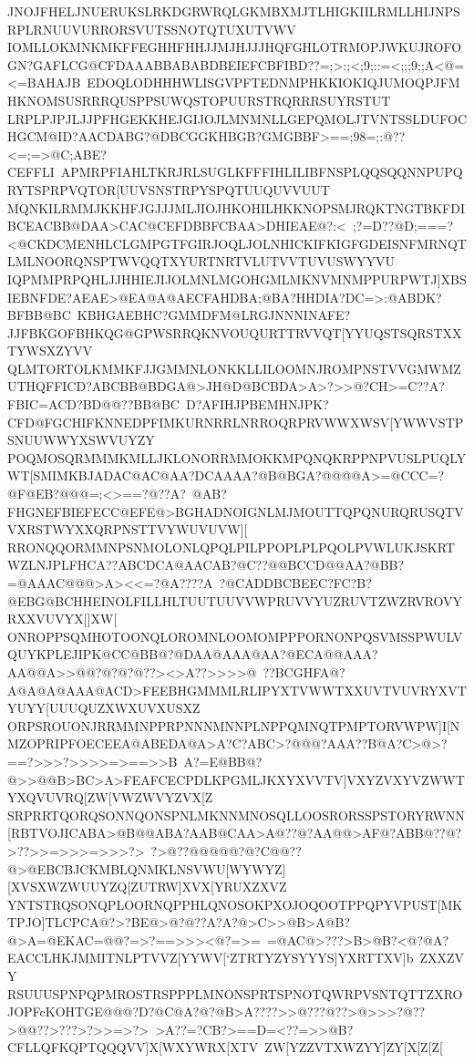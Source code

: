 {{{ JNOJFHELJNUERUKSLRKDGRWRQLGKMBXMJTLHIGKIILRMLLHIJNPSRPLRNUUVURRORSVUTSSNOTQTUXUTVWV}
 \hbox{IOMLLOKMNKMKFFEGHHFHHJJMJHJJJHQFGHLOTRMOPJWKUJROFOGN?GAFLCG@CFDAAABBABABDBEIEFCBFIBD??=;>:;<;9;::=<;;;9;;A<@=<=BAHAJB%
 EDOQLODHHHWLISGVPFTEDNMPHKKIOKIQJUMOQPJFMHKNOMSUSRRRQUSPPSUWQSTOPUURSTRQRRRSUYRSTUT}
 \hbox{LRPLPJPJLJJPFHGEKKHEJGIJOJLMNMNLLGEPQMOLJTVNTSSLDUFOCHGCM@ID?AACDABG?@DBCGGKHBGB?GMGBBF>==;98=;:@??<=;=>@C;ABE?CEFFLI%
 APMRPFIAHLTKRJRLSUGLKFFFIHLILIBFNSPLQQSQQNNPUPQRYTSPRPVQTOR[UUVSNSTRPYSPQTUUQUVVUUT}
 \hbox{MQNKILRMMJKKHFJGJJJMLJIOJHKOHILHKKNOPSMJRQKTNGTBKFDIBCEACBB@DAA>CAC@CEFDBBFCBAA>DHIEAE@?:<%
 ;?=D??@D;===?<@CKDCMENHLCLGMPGTFGIRJOQLJOLNHICKIFKIGFGDEISNFMRNQTLMLNOORQNSPTWVQQTXYURTNRTVLUTVVTUVUSWYYVU}
 \hbox{IQPMMPRPQHLJJHHIEJIJOLMNLMGOHGMLMKNVMNMPPURPWTJ]XBSIEBNFDE?AEAE>@EA@A@AECFAHDBA;@BA?HHDIA?DC=>:@ABDK?BFBB@BC%
 KBHGAEBHC?GMMDFM@LRGJNNNINAFE?JJFBKGOFBHKQG@GPWSRRQKNVOUQURTTRVVQT[YYUQSTSQRSTXXTYWSXZYVV}
 \hbox{QLMTORTOLKMMKFJJGMMNLONKKLLILOOMNJROMPNSTVVGMWMZUTHQFFICD?ABCBB@BDGA@>JH@D@BCBDA>A>?>>@?CH>=C??A?FBIC=ACD?BD@@??BB@BC%
 D?AFIHJPBEMHNJPK?CFD@FGCHIFKNNEDPFIMKURNRRLNRROQRPRVWWXWSV[YWWVSTPSNUUWWYXSWVUYZY}
 \hbox{POQMOSQRMMMKMLLJKLONORRMMOKKMPQNQKRPPNPVUSLPUQLYWT[SMIMKBJADAC@AC@AA?DCAAAA?@B@BGA?@@@@A>=@CCC=?@F@EB?@@@=;<>==?@??A?%
 @AB?FHGNEFBIEFECC@EFE@>BGHADNOIGNLMJMOUTTQPQNURQRUSQTVVXRSTWYXXQRPNSTTVYWUVUVW][}
 \hbox{RRONQQORMMNPSNMOLONLQPQLPILPPOPLPLPQOLPVWLUKJSKRTWZLNJPLFHCA??ABCDCA@AACAB?@C??@@BCCD@@AA?@BB?=@AAAC@@@>A><<=?@A????A%
 ?@CADDBCBEEC?FC?B?@EBG@BCHHEINOLFILLHLTUUTUUVVWPRUVVYUZRUVTZWZRVROVYRXXVUVYX[]XW[}
 \hbox{ONROPPSQMHOTOONQLOROMNLOOMOMPPPORNONPQSVMSSPWULVQUYKPLEJIPK@CC@BB@?@DAA@AAA@AA?@ECA@@AAA?AA@@A>>@@?@?@?@??><>A??>>>>@%
 ??BCGHFA@?A@A@A@AAA@ACD>FEEBHGMMMLRLIPYXTVWWTXXUVTVUVRYXVTYUYY[UUUQUZXWXUVXUSXZ}
 \hbox{ORPSROUONJRRMMNPPRPNNNMNNPLNPPQMNQTPMPTORVWPW]I[NMZOPRIPFOECEEA@ABEDA@A>A?C?ABC>?@@@?AAA??B@A?C>@>?==?>>>?>>>>=>==>>B%
 A?=E@BB@?@>>@@B>BC>A>FEAFCECPDLKPGMLJKXYXVVTV]VXYZVXYVZWWTYXQVUVRQ[ZW[VWZWVYZVX[Z}
 \hbox{SRPRRTQORQSONNQONSPNLMKNNMNOSQLLOOSRORSSPSTORYRWNN[RBTVOJICABA>@B@@ABA?AAB@CAA>A@??@?AA@@>AF@?ABB@??@?>??>>=>>>=>>>?>%
 ?>@??@@@@@?@?C@@??@>@EBCBJCKMBLQNMKLNSVWU[WYWYZ][XVSXWZWUUYZQ[ZUTRW]XVX[YRUXZXVZ}
 \hbox{YNTSTRQSONQPLOORNQPPHLQNOSOKPXOJOQOOTPPQPYVPUST[MKTPJO]TLCPCA@?>?BE@>@?@??A?A?@>C>>@B>A@B?@>A=@EKAC=@@?=>?==>>><@?=>=%
 =@AC@>???>B>@B?<@?@A?EACCLHKJMMITNLPTVVZ[YYWV[`ZTRTYZYSYYYS]YXRTTXV]b%
 ZXXZVY}
 \hbox{RSUUUSPNPQPMROSTRSPPPLMNONSPRTSPNOTQWRPVSNTQTTZXROJOPFcKOHTGE@@@?D?@C@A?@?@B>A????>>@???@??>@>>>?@??>@@??>???>?>>=>?>%
 >A??=?CB?>==D=<??=>>@B?CFLLQFKQPTQQQVV]X[WXYWRX[XTV%
 ZW[YZZVTXWZYY]ZY[X[Z[Z[}
 }}%
